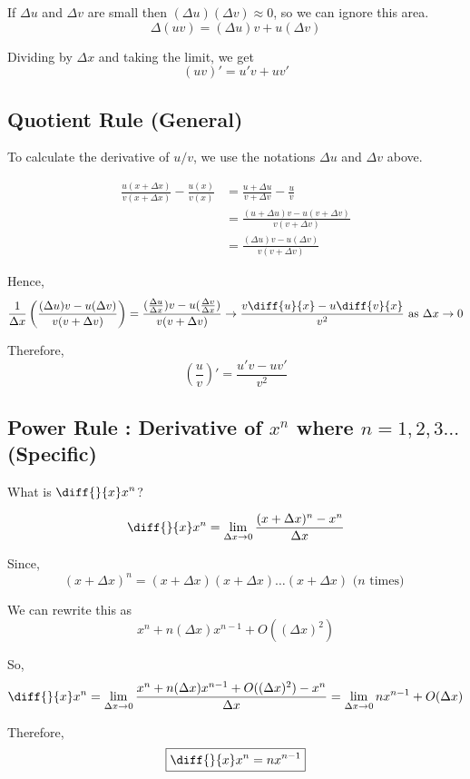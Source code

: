 If $\Delta u$ and $\Delta v$ are small then $(\Delta u)(\Delta v) \approx 0$, so we can ignore this area.
$$\Delta(uv) = (\Delta u)v + u(\Delta v)$$

Dividing by $\Delta x$ and taking the limit, we get
$$(uv)' = u'v + uv'$$

\subsection{Quotient Rule (General)}

To calculate the derivative of $u/v$, we use the notations $\Delta u$ and $\Delta v$ above.

\begin{align*}
	\frac{u(x+\Delta x)}{v(x+\Delta x)} - \frac{u(x)}{v(x)}
		& = \frac{u + \Delta u}{v + \Delta v} - \frac{u}{v} \\
		& = \frac{(u+\Delta u)v - u(v+\Delta v)}{v(v+\Delta v)} \\
		& = \frac{(\Delta u)v - u(\Delta v)}{v(v+\Delta v)}
\end{align*}

Hence,
$$
\frac{1}{\Delta x} \left( \frac{(\Delta u)v - u(\Delta v)}{v(v+\Delta v)} \right)
	= \frac{(\frac{\Delta u}{\Delta x})v - u(\frac{\Delta v}{\Delta x})}{v(v+\Delta v)}
	\to \frac{v\diff{u}{x} - u\diff{v}{x}}{v^2} \text{ as } \Delta x \to 0
$$

Therefore, 
$$\left( \frac{u}{v} \right)' = \frac{u'v - uv'}{v^2}$$



\subsection{Power Rule : Derivative of $x^n$ where $n = 1,2,3\ldots$ (Specific)}

What is $\displaystyle{ \diff{}{x} x^n }$?

$$ \diff{}{x} x^n = \lim_{\Delta x \to 0} \frac{(x+\Delta x)^n - x^n}{\Delta x} $$

Since, $$ (x+\Delta x)^n = (x+\Delta x)(x+\Delta x)\ldots(x+\Delta x) \text{ ($n$ times) } $$

We can rewrite this as $$ x^n + n(\Delta x)x^{n-1} + O((\Delta x)^2) $$

So, $$ \diff{}{x} x^n = \lim_{\Delta x \to 0} \frac{x^n + n(\Delta x)x^{n-1} + O((\Delta x)^2) - x^n}{\Delta x} = \lim_{\Delta x \to 0} nx^{n-1} + O(\Delta x) $$

Therefore, $$ \boxed{ \diff{}{x} x^n = nx^{n-1} } $$

